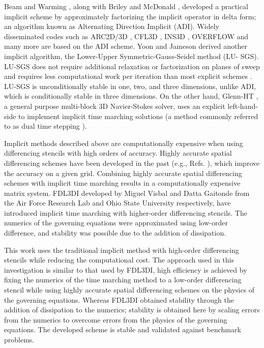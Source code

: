 \documentclass[conf]{new-aiaa}
\begin{document}
Beam and Warming \cite{Beam}, along with Briley and McDonald \cite{Briley}, developed a practical implicit scheme by approximately factorizing the implicit operator in delta form; an algorithm known as Alternating Direction Implicit (ADI). 
Widely disseminated codes such as ARC2D/3D \cite{ARC2D, ARC3D}, CFL3D \cite{CFL3D}, INS3D \cite{INS3D}, OVERFLOW \cite{OVERFLOW} and many more are based on the ADI scheme. 
Yoon and Jameson derived another implicit algorithm, the Lower-Upper Symmetric-Gauss-Seidel method (LU- SGS). 
LU-SGS does not require additional relaxation or factorization on planes of sweep and requires less computational work per iteration than most explicit schemes \cite{LUSGS, YoonLUSGS}. 
LU-SGS is unconditionally stable in one, two, and three dimensions, unlike ADI, which is conditionally stable in three dimensions. 
On the other hand, Glenn-HT \cite{GlennHT}, a general purpose multi-block 3D Navier-Stokes solver, uses an explicit left-hand-side to implement implicit time marching solutions (a method commonly referred to as dual time stepping \cite{DualTimeStepping, Dual_Time, Sheih}). 


Implicit methods described above are computationally expensive when using differencing stencils with high orders of accuracy. 
Highly accurate spatial differencing schemes have been developed in the past (e.g., Refs. \cite{Lele2, DRP, Optimized_Compact, Prefactored, FDL3DI3, FDL3DI_C}), which improve the accuracy on a given grid. 
Combining highly accurate spatial differencing schemes with implicit time marching results in a computationally expensive matrix system. 
FDL3DI \cite{FDL3DI_A, FDL3DI_B, FDL3DI_C} developed by Miguel Visbal and Datta Gaitonde from the Air Force Research Lab and Ohio State University respectively, have introduced implicit time marching with higher-order differencing stencils. 
The numerics of the governing equations were approximated using low-order difference, and stability was possible due to the addition of dissipation. 

This work uses the traditional implicit method with high-order differencing stencils while reducing the computational cost. 
The approach used in this investigation is similar to that used by FDL3DI, high efficiency is achieved by fixing the numerics of the time marching method to a low-order differencing stencil while using highly accurate spatial differencing schemes on the physics of the governing equations.
Whereas FDL3DI obtained stability through the addition of dissipation to the numerics; stability is obtained here by scaling errors from the numerics to overcome errors from the physics of the governing equations. 
The developed scheme is stable and validated against benchmark problems.
 
\end{document}
